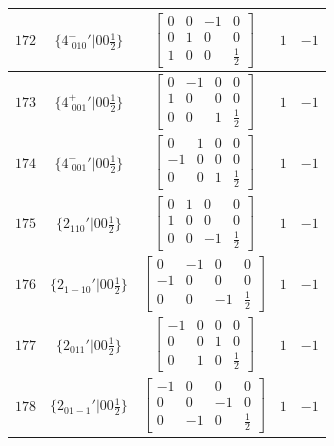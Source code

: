 \documentclass[fleqn,8pt]{jsarticle}
\begin{document}
\begin{longtable}{ccccc}
$ 172 $ & $ \{4^{-}_{\,\,010}{}'|0 0 \frac{1}{2}\} $ & $ \begin{bmatrix} 0 & 0 & -1 & 0 \\ 0 & 1 & 0 & 0 \\ 1 & 0 & 0 & \frac{1}{2} \end{bmatrix} $ & $ 1 $ & $ -1 $ \\ \hline
$ 173 $ & $ \{4^{+}_{\,\,001}{}'|0 0 \frac{1}{2}\} $ & $ \begin{bmatrix} 0 & -1 & 0 & 0 \\ 1 & 0 & 0 & 0 \\ 0 & 0 & 1 & \frac{1}{2} \end{bmatrix} $ & $ 1 $ & $ -1 $ \\ \hline
$ 174 $ & $ \{4^{-}_{\,\,001}{}'|0 0 \frac{1}{2}\} $ & $ \begin{bmatrix} 0 & 1 & 0 & 0 \\ -1 & 0 & 0 & 0 \\ 0 & 0 & 1 & \frac{1}{2} \end{bmatrix} $ & $ 1 $ & $ -1 $ \\ \hline
$ 175 $ & $ \{2{}_{110}{}'|0 0 \frac{1}{2}\} $ & $ \begin{bmatrix} 0 & 1 & 0 & 0 \\ 1 & 0 & 0 & 0 \\ 0 & 0 & -1 & \frac{1}{2} \end{bmatrix} $ & $ 1 $ & $ -1 $ \\ \hline
$ 176 $ & $ \{2{}_{1-10}{}'|0 0 \frac{1}{2}\} $ & $ \begin{bmatrix} 0 & -1 & 0 & 0 \\ -1 & 0 & 0 & 0 \\ 0 & 0 & -1 & \frac{1}{2} \end{bmatrix} $ & $ 1 $ & $ -1 $ \\ \hline
$ 177 $ & $ \{2{}_{011}{}'|0 0 \frac{1}{2}\} $ & $ \begin{bmatrix} -1 & 0 & 0 & 0 \\ 0 & 0 & 1 & 0 \\ 0 & 1 & 0 & \frac{1}{2} \end{bmatrix} $ & $ 1 $ & $ -1 $ \\ \hline
$ 178 $ & $ \{2{}_{01-1}{}'|0 0 \frac{1}{2}\} $ & $ \begin{bmatrix} -1 & 0 & 0 & 0 \\ 0 & 0 & -1 & 0 \\ 0 & -1 & 0 & \frac{1}{2} \end{bmatrix} $ & $ 1 $ & $ -1 $ \\ \hline

\end{longtable}
\end{document}
